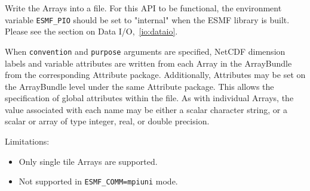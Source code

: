      Write the Arrays into a file. For this API to be functional,
     the environment variable {\tt ESMF\_PIO} should be set to "internal"
     when the ESMF library is built. Please see the section on 
     Data I/O,~\ref{io:dataio}.
  
     When {\tt convention} and {\tt purpose} arguments are specified, NetCDF dimension
     labels and variable attributes are written from each Array in the ArrayBundle
     from the corresponding Attribute package. Additionally, Attributes may be
     set on the ArrayBundle level under the same Attribute package.  This allows
     the specification of global attributes within the file.
     As with individual Arrays, the value associated with each name may be either
     a scalar character string, or a scalar or array of type integer, real, or
     double precision.
  
     Limitations:
     \begin{itemize}
       \item Only single tile Arrays are supported.
       \item Not supported in {\tt ESMF\_COMM=mpiuni} mode.
     \end{itemize}
  
